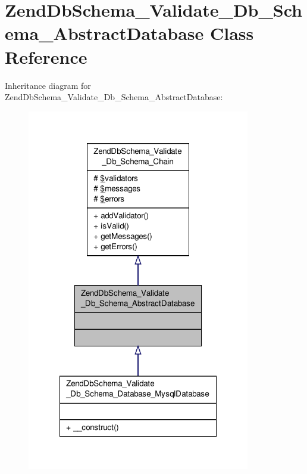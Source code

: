 \hypertarget{classZendDbSchema__Validate__Db__Schema__AbstractDatabase}{\section{Zend\-Db\-Schema\-\_\-\-Validate\-\_\-\-Db\-\_\-\-Schema\-\_\-\-Abstract\-Database Class Reference}
\label{classZendDbSchema__Validate__Db__Schema__AbstractDatabase}
}


Inheritance diagram for Zend\-Db\-Schema\-\_\-\-Validate\-\_\-\-Db\-\_\-\-Schema\-\_\-\-Abstract\-Database\-:\nopagebreak
\begin{figure}[H]
\begin{center}
\leavevmode
\includegraphics[width=276pt]{classZendDbSchema__Validate__Db__Schema__AbstractDatabase__inherit__graph}
\end{center}
\end{figure}



